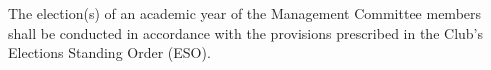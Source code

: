 
\section{}
The election(s) of an academic year of the Management Committee members shall be conducted in accordance with the provisions prescribed in the Club's Elections Standing Order (ESO).